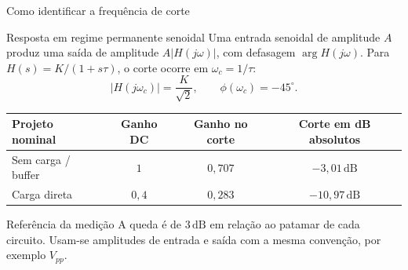 \begin{frame}{Como identificar a frequência de corte}
  \small
  \begin{block}{Resposta em regime permanente senoidal}
    Uma entrada senoidal de amplitude $A$ produz uma saída de amplitude
    $A|H(j\omega)|$, com defasagem $\arg H(j\omega)$.
    Para $H(s)=K/(1+s\tau)$, o corte ocorre em $\omega_c=1/\tau$:
    \[
      |H(j\omega_c)|=\frac{K}{\sqrt{2}},\qquad \phi(\omega_c)=-45^\circ.
    \]
  \end{block}

  {\centering
    \begin{tabular}{lccc}
      \toprule
      Projeto nominal & Ganho DC & Ganho no corte & Corte em dB absolutos \\
      \midrule
      Sem carga / buffer & $1$ & $0{,}707$ & $-3{,}01\,\mathrm{dB}$ \\
      Carga direta & $0{,}4$ & $0{,}283$ & $-10{,}97\,\mathrm{dB}$ \\
      \bottomrule
    \end{tabular}\par
  }

  \begin{alertblock}{Referência da medição}
    A queda é de $3\,\mathrm{dB}$ em relação ao patamar de cada circuito.
    Usam-se amplitudes de entrada e saída com a mesma convenção, por exemplo $V_{pp}$.
  \end{alertblock}
\end{frame}
